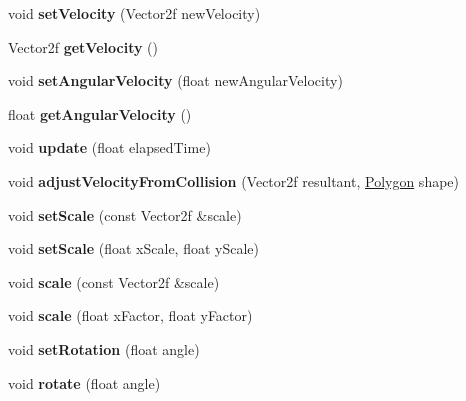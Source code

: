 \begin{DoxyCompactItemize}
void {\bfseries set\+Velocity} (Vector2f new\+Velocity)
\item 
\mbox{\label{class_polygon_a82909752be649f103b26657aae3ff0c9}} 
Vector2f {\bfseries get\+Velocity} ()
\item 
\mbox{\label{class_polygon_a9444a506f5e33f11772854396e1aae0e}} 
void {\bfseries set\+Angular\+Velocity} (float new\+Angular\+Velocity)
\item 
\mbox{\label{class_polygon_a1c28d47f1c0f779cfd5ef31815046a6f}} 
float {\bfseries get\+Angular\+Velocity} ()
\item 
\mbox{\label{class_polygon_a556290c37a29ce71f8488a75509b56af}} 
void {\bfseries update} (float elapsed\+Time)
\item 
\mbox{\label{class_polygon_aeb1576854a28a02afaa636aadf31b992}} 
void {\bfseries adjust\+Velocity\+From\+Collision} (Vector2f resultant, \mbox{\hyperlink{class_polygon}{Polygon}} shape)
\item 
\mbox{\label{class_polygon_aacc719afa9e8befd7ab7ba5ea3eb4d24}} 
void {\bfseries set\+Scale} (const Vector2f \&scale)
\item 
\mbox{\label{class_polygon_a1454b2d9f4ca39f627ea6c54a26a3287}} 
void {\bfseries set\+Scale} (float x\+Scale, float y\+Scale)
\item 
\mbox{\label{class_polygon_ab908fe54a3dfad70b489578b4d0f0e42}} 
void {\bfseries scale} (const Vector2f \&scale)
\item 
\mbox{\label{class_polygon_ac2b18a3139994184f83967add25f72aa}} 
void {\bfseries scale} (float x\+Factor, float y\+Factor)
\item 
\mbox{\label{class_polygon_a6eaf72c376c1fc1d6a9fba7b34b2d93d}} 
void {\bfseries set\+Rotation} (float angle)
\item 
\mbox{\label{class_polygon_aa31dcb66b6c3bffd9643590abf805c26}} 
void {\bfseries rotate} (float angle)
\item 

\end{DoxyCompactItemize}
